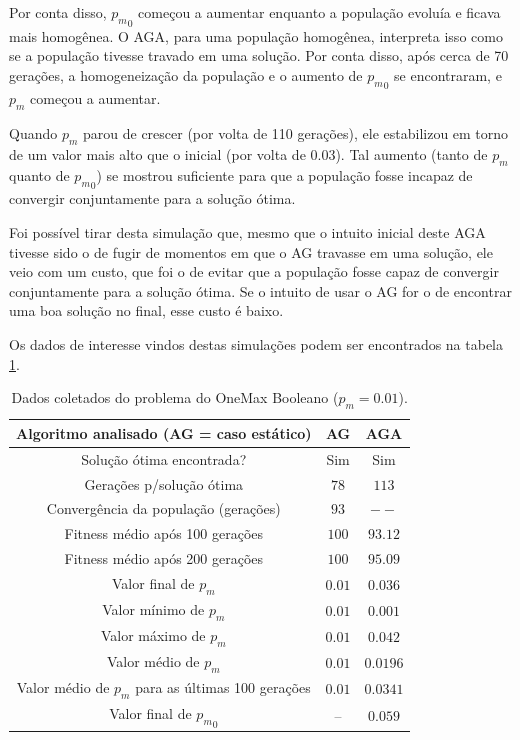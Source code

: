 Por conta disso, ${p_m}_0$ começou a aumentar enquanto a população evoluía e ficava mais homogênea. O AGA, para uma população homogênea, interpreta isso como se a população tivesse travado em uma solução. Por conta disso, após cerca de 70 gerações, a homogeneização da população e o aumento de ${p_m}_0$ se encontraram, e $p_m$ começou a aumentar.

Quando $p_m$ parou de crescer (por volta de 110 gerações), ele estabilizou em torno de um valor mais alto que o inicial (por volta de 0.03). Tal aumento (tanto de $p_m$ quanto de ${p_m}_0$) se mostrou suficiente para que a população fosse incapaz de convergir conjuntamente para a solução ótima.

Foi possível tirar desta simulação que, mesmo que o intuito inicial deste AGA tivesse sido o de fugir de momentos em que o AG travasse em uma solução, ele veio com um custo, que foi o de evitar que a população fosse capaz de convergir conjuntamente para a solução ótima. Se o intuito de usar o AG for o de encontrar uma boa solução no final, esse custo é baixo.

Os dados de interesse vindos destas simulações podem ser encontrados na tabela \ref{tab:onemax_boolean}.

\begin{table}
\caption{Dados coletados do problema do OneMax Booleano ($p_m = 0.01$).}
\label{tab:onemax_boolean}

\center
\begin{tabular}{|c|cc|}
	\hline
	Algoritmo analisado (AG = caso estático) 			& AG		& AGA		\\
	\hline
	Solução ótima encontrada?							& Sim		& Sim		\\
	Gerações p/solução ótima							& $78$		& $113$		\\
	Convergência da população (gerações)				& $93$		& $--$		\\
	Fitness médio após 100 gerações						& $100$		& $93.12$	\\
	Fitness médio após 200 gerações 					& $100$		& $95.09$	\\
	Valor final de $p_m$								& $0.01$ 	& $0.036$	\\
	Valor mínimo de $p_m$								& $0.01$	& $0.001$	\\
	Valor máximo de $p_m$								& $0.01$	& $0.042$	\\
	Valor médio de $p_m$								& $0.01$	& $0.0196$	\\
	Valor médio de $p_m$ para as últimas 100 gerações	& $0.01$	& $0.0341$	\\
	Valor final de ${p_m}_0$								& --		& $0.059$	\\
	\hline
\end{tabular}
\end{table}

